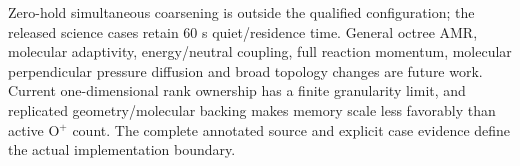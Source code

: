 Zero-hold simultaneous coarsening is outside the qualified configuration;
the released science cases retain 60 s quiet/residence time. General
octree AMR, molecular adaptivity, energy/neutral coupling, full reaction
momentum, molecular perpendicular pressure diffusion and broad topology
changes are future work. Current one-dimensional rank ownership has a
finite granularity limit, and replicated geometry/molecular backing makes
memory scale less favorably than active O$^+$ count. The complete annotated
source and explicit case evidence define the actual implementation boundary.
